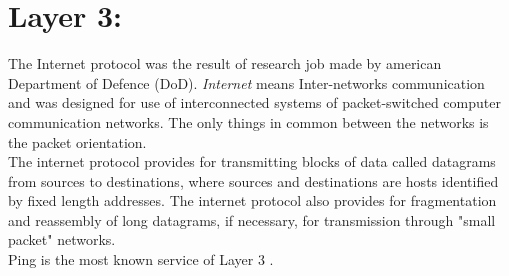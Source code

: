 \chapter{Layer 3: }
The Internet protocol was the result of research job made by american Department of Defence (DoD). \textit{Internet} means Inter-networks communication and was designed for use of interconnected systems of packet-switched computer communication networks. The only things in common between the networks is the packet orientation.\\
The internet protocol provides for transmitting blocks of data called datagrams from sources to destinations, where sources and destinations are hosts identified by fixed length addresses.  The internet protocol also provides for fragmentation and reassembly of long datagrams, if necessary, for transmission through "small packet" networks.\\

Ping is the most known service of Layer 3 \cite{RFC791}.